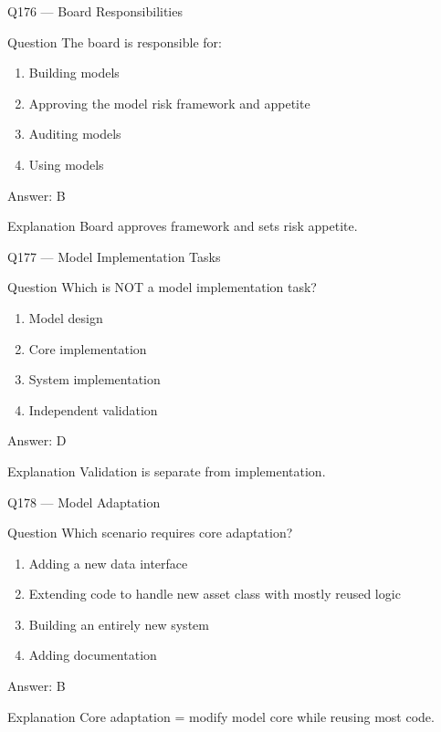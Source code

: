 \documentclass[aspectratio=169,8pt]{beamer}
\begin{document}
	\begin{frame}{Q176 --- Board Responsibilities}
		\begin{block}{Question}
			The board is responsible for:
		\end{block}
		\begin{enumerate}
			\item Building models
			\item Approving the model risk framework and appetite
			\item Auditing models
			\item Using models
		\end{enumerate}
		\begin{exampleblock}{Answer: B}\end{exampleblock}
		\begin{block}{Explanation}
			Board approves framework and sets risk appetite.
		\end{block}
	\end{frame}
	
	\begin{frame}{Q177 --- Model Implementation Tasks}
		\begin{block}{Question}
			Which is NOT a model implementation task?
		\end{block}
		\begin{enumerate}
			\item Model design
			\item Core implementation
			\item System implementation
			\item Independent validation
		\end{enumerate}
		\begin{exampleblock}{Answer: D}\end{exampleblock}
		\begin{block}{Explanation}
			Validation is separate from implementation.
		\end{block}
	\end{frame}
	
	\begin{frame}{Q178 --- Model Adaptation}
		\begin{block}{Question}
			Which scenario requires core adaptation?
		\end{block}
		\begin{enumerate}
			\item Adding a new data interface
			\item Extending code to handle new asset class with mostly reused logic
			\item Building an entirely new system
			\item Adding documentation
		\end{enumerate}
		\begin{exampleblock}{Answer: B}\end{exampleblock}
		\begin{block}{Explanation}
			Core adaptation = modify model core while reusing most code.
		\end{block}
	\end{frame}
	
\end{document}
